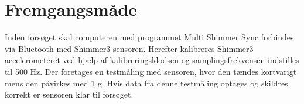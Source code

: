 \section{Fremgangsmåde}
Inden forsøget skal computeren med programmet Multi Shimmer Sync forbindes via Bluetooth med Shimmer3 sensoren. Herefter kalibreres Shimmer3 accelerometeret ved hjælp af kalibreringsklodsen og samplingsfrekvensen indstilles til 500 Hz. %
Der foretages en testmåling med sensoren, hvor den tændes kortvarigt mens den påvirkes med 1 g. Hvis data fra denne testmåling optages og skildres korrekt er sensoren klar til forsøget.

